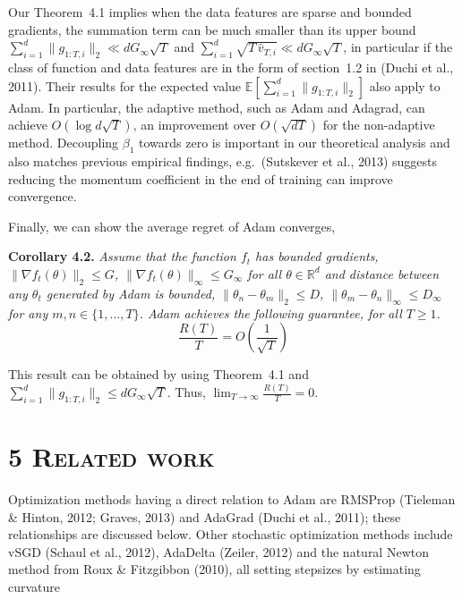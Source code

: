\documentclass[11pt]{article}
\begin{document}
\noindent
Our Theorem~4.1 implies when the data features are sparse and
bounded gradients, the summation term can be much smaller than
its upper bound
$\sum_{i=1}^{d} \|g_{1:T,i}\|_2 \ll dG_\infty\sqrt{T}$ and
$\sum_{i=1}^{d} \sqrt{T\,\widehat{v}_{T,i}} \ll dG_\infty\sqrt{T}$,
in particular if the class of function and data features are in
the form of section~1.2 in (Duchi et al., 2011). Their results
for the expected value
$\mathbb{E}[\sum_{i=1}^{d} \|g_{1:T,i}\|_2]$ also apply to Adam.
In particular, the adaptive method, such as Adam and Adagrad, can
achieve $O(\log d\sqrt{T})$, an improvement over $O(\sqrt{dT})$
for the non-adaptive method. Decoupling $\beta_1$ towards zero is
important in our theoretical analysis and also matches previous
empirical findings, e.g.\ (Sutskever et al., 2013) suggests
reducing the momentum coefficient in the end of training can
improve convergence.

Finally, we can show the average regret of Adam converges,

\vspace{0.5em}

\noindent\textbf{Corollary 4.2.} \emph{Assume that the function
$f_t$ has bounded gradients,
$\|\nabla f_t(\theta)\|_2 \leq G$,
$\|\nabla f_t(\theta)\|_\infty \leq G_\infty$ for all
$\theta \in \mathbb{R}^d$ and distance between any $\theta_t$
generated by Adam is bounded,
$\|\theta_n - \theta_m\|_2 \leq D$,
$\|\theta_m - \theta_n\|_\infty \leq D_\infty$ for any
$m, n \in \{1, \ldots, T\}$. Adam achieves the following
guarantee, for all $T \geq 1$.}
%
\[
\frac{R(T)}{T} = O\!\left(\frac{1}{\sqrt{T}}\right)
\]

\noindent
This result can be obtained by using Theorem~4.1 and
$\sum_{i=1}^{d} \|g_{1:T,i}\|_2 \leq dG_\infty\sqrt{T}$. Thus,
$\lim_{T \to \infty} \frac{R(T)}{T} = 0$.

\vspace{0.5em}

\section*{5 \textsc{Related work}}

Optimization methods having a direct relation to Adam are RMSProp
(Tieleman \& Hinton, 2012; Graves, 2013) and AdaGrad (Duchi et al.,
2011); these relationships are discussed below. Other stochastic
optimization methods include vSGD (Schaul et al., 2012), AdaDelta
(Zeiler, 2012) and the natural Newton method from Roux \&
Fitzgibbon (2010), all setting stepsizes by estimating curvature

\end{document}
